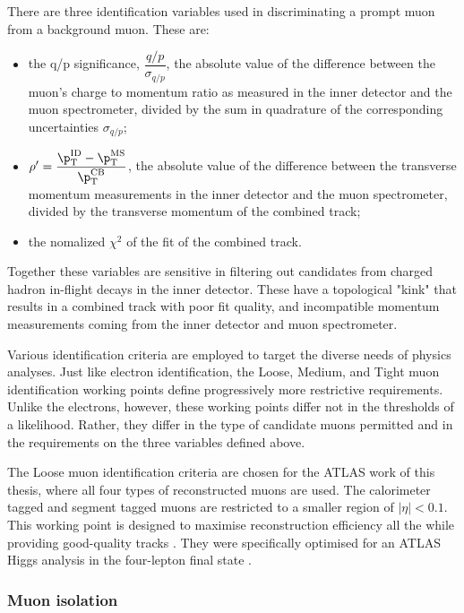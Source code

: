 There are three identification variables used in discriminating a prompt muon from a background muon. These are:
\begin{itemize}
    \item the q/p significance, $\dfrac{q/p}{\sigma_{q/p}}$, the absolute value of the difference between the muon's charge to momentum ratio as measured in the inner detector and the muon spectrometer, divided by the sum in quadrature of the corresponding uncertainties $\sigma_{q/p}$;
    \item $\rho'=\dfrac{\p_{\text{T}}^{\text{ID}}-\p_{\text{T}}^{\text{MS}}}{\p_{\text{T}}^{\text{CB}}}$, the absolute value of the difference between the transverse momentum measurements in the inner detector and the muon spectrometer, divided by the transverse momentum of the combined track;
    \item the nomalized $\chi^2$ of the fit of the combined track.
\end{itemize}
Together these variables are sensitive in filtering out candidates from charged hadron in-flight decays in the inner detector. These have a topological "kink" that results in a combined track with poor fit quality, and incompatible momentum measurements coming from the inner detector and muon spectrometer. 

Various identification criteria are employed to target the diverse needs of physics analyses. Just like electron identification, the Loose, Medium, and Tight muon identification working points define progressively more restrictive requirements. Unlike the electrons, however, these working points differ not in the thresholds of a likelihood. Rather, they differ in the type of candidate muons permitted and in the requirements on the three variables defined above. 

The Loose muon identification criteria are chosen for the ATLAS work of this thesis, where all four types of reconstructed muons are used. The calorimeter tagged and segment tagged muons are restricted to a smaller region of $|\eta|<0.1$. This working point is designed to maximise reconstruction efficiency all the while providing good-quality tracks \cite{ATLAS_muon_reco_2016}. They were specifically optimised for an ATLAS Higgs analysis in the four-lepton final state \cite{ATLAS_H4l_2015}.  

\subsubsection{Muon isolation}

